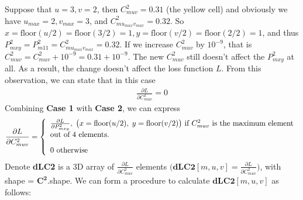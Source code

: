 \documentclass[a4paper,12pt]{article}
\begin{document}
Suppose that $u = 3, v = 2$, then $C^2_{muv} = 0.31$ (the yellow cell) and obviously we have $u_{max} = 2, v_{max} = 3$, and $C^2_{mu_{max}v_{max}} = 0.32$. So $x = \text{floor}(u / 2) = \text{floor}(3 / 2) = 1, y = \text{floor}(v / 2) = \text{floor}(2 / 2) = 1$, and thus $P^2_{mxy} = P^2_{m11} = C^2_{mu_{max}v_{max}} = 0.32$. If we increase $C^2_{muv}$ by $10^{-9}$, that is $C^2_{muv} = C^2_{muv} + 10^{-9} = 0.31 + 10^{-9}$. The new $C^2_{muv}$ still doesn't affect the $P^2_{mxy}$ at all. As a result, the change doesn't affect the loss function $L$. From this observation, we can state that in this case
\begin{equation}
\begin{aligned}
\frac{\partial{L}}{\partial{C^2_{muv}}} = 0  \label{eq40}
\end{aligned}
\end{equation}
Combining \textbf{Case 1} with \textbf{Case 2}, we can express
\begin{equation}
\begin{aligned}
\frac{\partial{L}}{\partial{C^2_{muv}}} = \left\{
                                            \begin{array}{ll}
                                              \frac{\partial{L}}{\partial{P^2_{mxy}}},\thickspace \big(x = \text{floor}(u/2), \thickspace y = \text{floor}(v/2)\big) \text{ if } C^2_{muv} \text{ is the maximum element}\\ \text{out of 4 elements. } \\[0.3cm]
                                              0 \text{ otherwise }
                                            \end{array}
                                          \right. \label{eq41}
\end{aligned}
\end{equation}
Denote \textbf{dLC2} is a 3D array of $\frac{\partial{L}}{\partial{C^2_{muv}}}$ elements $\Big(\textbf{dLC2}[m, u, v] = \frac{\partial{L}}{\partial{C^2_{muv}}}\Big)$, with shape = $\boldsymbol{C^2}$.shape. We can form a procedure to calculate $\textbf{dLC2}[m, u, v]$ as follows:
\end{document}
